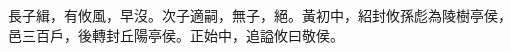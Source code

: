 \begin{pinyinscope}
 
 
 
 長子緝，有攸風，早沒。次子適嗣，無子，絕。黃初中，紹封攸孫彪為陵樹亭侯，邑三百戶，後轉封丘陽亭侯。正始中，追謚攸曰敬侯。
 
 
\end{pinyinscope}